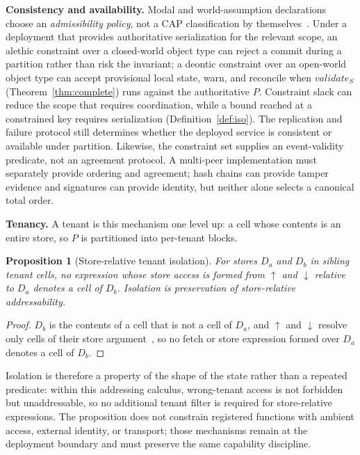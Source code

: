 \documentclass[10pt,twocolumn]{article}
\theoremstyle{plain}
\newtheorem{proposition}{Proposition}
\theoremstyle{definition}
\begin{document}
\smallskip\noindent\textbf{Consistency and availability.} Modal and world-assumption declarations choose an \emph{admissibility policy}, not a CAP classification by themselves~\cite{gilbert02}. Under a deployment that provides authoritative serialization for the relevant scope, an alethic constraint over a closed-world object type can reject a commit during a partition rather than risk the invariant; a deontic constraint over an open-world object type can accept provisional local state, warn, and reconcile when $\mathit{validate}_S$ (Theorem~\ref{thm:complete}) runs against the authoritative $P$. Constraint slack can reduce the scope that requires coordination, while a bound reached at a constrained key requires serialization (Definition~\ref{def:iso}). The replication and failure protocol still determines whether the deployed service is consistent or available under partition. Likewise, the constraint set supplies an event-validity predicate, not an agreement protocol. A multi-peer implementation must separately provide ordering and agreement; hash chains can provide tamper evidence and signatures can provide identity, but neither alone selects a canonical total order.

\smallskip\noindent\textbf{Tenancy.} A tenant is this mechanism one level up: a cell whose contents is an entire store, so $P$ is partitioned into per-tenant blocks.

\begin{proposition}[Store-relative tenant isolation]\label{prop:tenant}
For stores $D_a$ and $D_b$ in sibling tenant cells, no expression whose store access is formed from $\uparrow$ and $\downarrow$ relative to $D_a$ denotes a cell of $D_b$. Isolation is preservation of store-relative addressability.
\end{proposition}
\begin{proof}
$D_b$ is the contents of a cell that is not a cell of $D_a$, and $\uparrow$ and $\downarrow$ resolve only cells of their store argument~\cite[Secs.\,13.3.4,\,14.3]{backus78}, so no fetch or store expression formed over $D_a$ denotes a cell of $D_b$.
\end{proof}

\noindent Isolation is therefore a property of the shape of the state rather than a repeated predicate: within this addressing calculus, wrong-tenant access is not forbidden but unaddressable, so no additional tenant filter is required for store-relative expressions. The proposition does not constrain registered functions with ambient access, external identity, or transport; those mechanisms remain at the deployment boundary and must preserve the same capability discipline.
\end{document}
